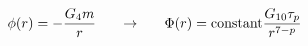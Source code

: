 \begin{equation}
\phi(r) = - \frac{G_4 m}{r}
\;\;\;\;\;\; \rightarrow
\;\;\;\;\;\; \Phi(r) = {\rm constant} \frac{G_{10} \tau_p}{r^{7-p}}
\end{equation}

